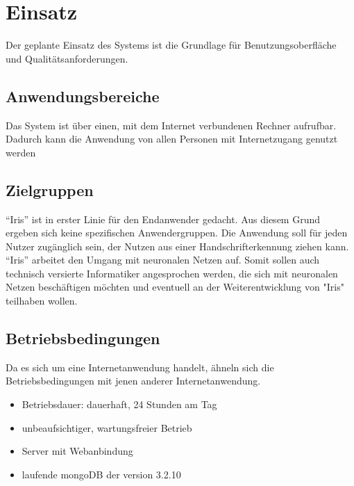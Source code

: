 \section{Einsatz}
Der geplante Einsatz des Systems ist die Grundlage für Benutzungsoberfläche und
Qualitätsanforderungen.
 
\subsection{Anwendungsbereiche}

Das System ist über einen, mit dem Internet verbundenen Rechner aufrufbar.
Dadurch kann die Anwendung von allen Personen mit Internetzugang genutzt werden

\subsection{Zielgruppen}

"`Iris"' ist in erster Linie für den Endanwender gedacht. Aus diesem Grund ergeben sich keine spezifischen Anwendergruppen. Die Anwendung soll für jeden Nutzer zugänglich sein, der Nutzen aus einer Handschrifterkennung ziehen kann.
"`Iris"' arbeitet den Umgang mit neuronalen Netzen auf. Somit sollen auch technisch versierte Informatiker angesprochen werden, die sich mit neuronalen Netzen beschäftigen möchten und eventuell an der Weiterentwicklung von "Iris" teilhaben wollen.

\subsection{Betriebsbedingungen}

Da es sich um eine Internetanwendung handelt, ähneln sich die Betriebsbedingungen mit jenen anderer Internetanwendung.

\begin{itemize}
	\item Betriebsdauer: dauerhaft, 24 Stunden am Tag
	\item unbeaufsichtiger, wartungsfreier Betrieb
	\item Server mit Webanbindung
	\item laufende mongoDB der version 3.2.10
\end{itemize}
